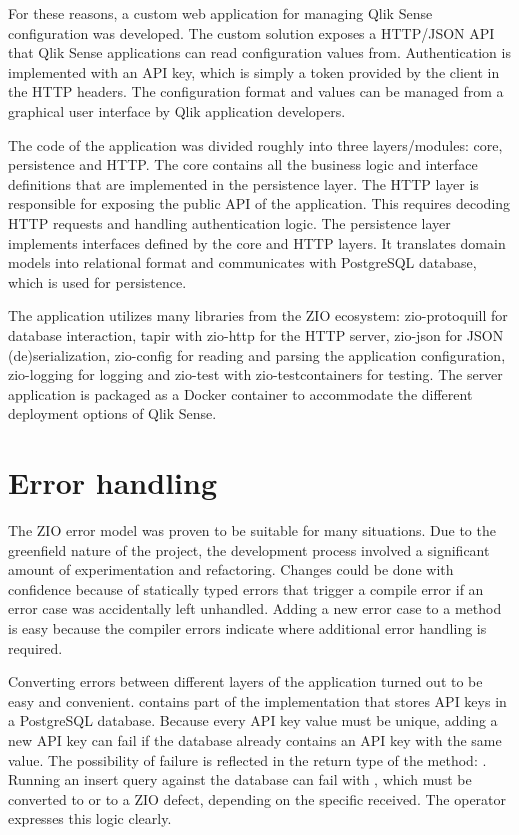 For these reasons, a custom web application for managing Qlik Sense configuration was developed. The custom solution exposes a HTTP/JSON API that Qlik Sense applications can read configuration values from. Authentication is implemented with an API key, which is simply a token provided by the client in the HTTP headers. The configuration format and values can be managed from a graphical user interface by Qlik application developers.

The code of the application was divided roughly into three layers/modules: core, persistence and HTTP. The core contains all the business logic and interface definitions that are implemented in the persistence layer. The HTTP layer is responsible for exposing the public API of the application. This requires decoding HTTP requests and handling authentication logic. The persistence layer implements interfaces defined by the core and HTTP layers. It translates domain models into relational format and communicates with PostgreSQL database, which is used for persistence.

The application utilizes many libraries from the ZIO ecosystem: zio-protoquill for database interaction, tapir with zio-http for the HTTP server, zio-json for JSON (de)serialization, zio-config for reading and parsing the application configuration, zio-logging for logging and zio-test with zio-testcontainers for testing. The server application is packaged as a Docker container to accommodate the different deployment options of Qlik Sense.


\section{Error handling}
The ZIO error model was proven to be suitable for many situations. Due to the greenfield nature of the project, the development process involved a significant amount of experimentation and refactoring. Changes could be done with confidence because of statically typed errors that trigger a compile error if an error case was accidentally left unhandled. Adding a new error case to a method is easy because the compiler errors indicate where additional error handling is required.

Converting errors between different layers of the application turned out to be easy and convenient.  contains part of the  implementation that stores API keys in a PostgreSQL database. Because every API key value must be unique, adding a new API key can fail if the database already contains an API key with the same value. The possibility of failure is reflected in the return type of the  method: . Running an insert query against the database can fail with , which must be converted to  or to a ZIO defect, depending on the specific  received. The  operator expresses this logic clearly.

